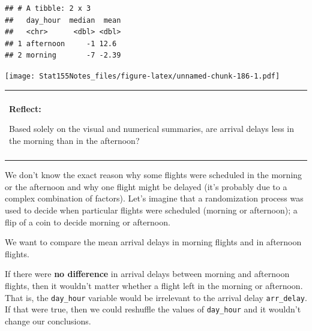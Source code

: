 \documentclass[]{book}
\newenvironment{Shaded}{\begin{snugshade}}{\end{snugshade}}
\newcommand{\DataTypeTok}[1]{\textcolor[rgb]{0.13,0.29,0.53}{#1}}
\newcommand{\KeywordTok}[1]{\textcolor[rgb]{0.13,0.29,0.53}{\textbf{#1}}}
\newcommand{\NormalTok}[1]{#1}
\newcommand{\OperatorTok}[1]{\textcolor[rgb]{0.81,0.36,0.00}{\textbf{#1}}}
\newcommand{\StringTok}[1]{\textcolor[rgb]{0.31,0.60,0.02}{#1}}
\newenvironment{reflect}
{
    \begin{center}
    
    \begin{tabular}{|p{0.8\textwidth}|}
    \rowcolor{LightBlue}
    \hline\\
    \rowcolor{LightBlue}
    \textbf{Reflect:}
}
{
    \\\rowcolor{LightBlue}
    \\\hline
    \end{tabular} 
    \end{center}
}
\begin{document}
\begin{Shaded}
\end{Shaded}

\begin{verbatim}
## # A tibble: 2 x 3
##   day_hour  median  mean
##   <chr>      <dbl> <dbl>
## 1 afternoon     -1 12.6 
## 2 morning       -7 -2.39
\end{verbatim}

\begin{Shaded}
\end{Shaded}

\texttt{[image: Stat155Notes\_files/figure-latex/unnamed-chunk-186-1.pdf]}

\begin{reflect}
Based solely on the visual and numerical summaries, are arrival delays
less in the morning than in the afternoon?
\end{reflect}

We don't know the exact reason why some flights were scheduled in the morning or the afternoon and why one flight might be delayed (it's probably due to a complex combination of factors). Let's imagine that a randomization process was used to decide when particular flights were scheduled (morning or afternoon); a flip of a coin to decide morning or afternoon.

We want to compare the mean arrival delays in morning flights and in afternoon flights.

If there were \textbf{no difference} in arrival delays between morning and afternoon flights, then it wouldn't matter whether a flight left in the morning or afternoon. That is, the \texttt{day\_hour} variable would be irrelevant to the arrival delay \texttt{arr\_delay}. If that were true, then we could reshuffle the values of \texttt{day\_hour} and it wouldn't change our conclusions.
\end{document}
